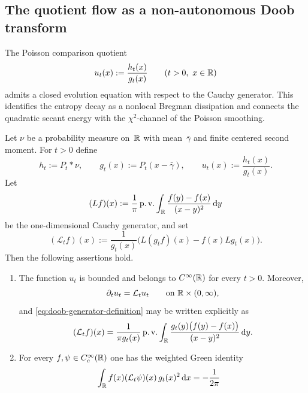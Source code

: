 \subsection{The quotient flow as a non-autonomous Doob transform}

The Poisson comparison quotient
\[
u_t(x):=\frac{h_t(x)}{g_t(x)}
\qquad(t>0,\ x\in\mathbb{R})
\]
admits a closed evolution equation with respect to the Cauchy generator.
This identifies the entropy decay as a nonlocal Bregman dissipation and
connects the quadratic secant energy with the $\chi^2$-channel of the
Poisson smoothing.

\begin{theorem}\label{thm:poisson-doob-phi-entropy}
Let $\nu$ be a probability measure on~$\mathbb{R}$ with mean~$\bar\gamma$ and
finite centered second moment.  For $t>0$ define
\[
h_t:=P_t*\nu,
\qquad
g_t(x):=P_t(x-\bar\gamma),
\qquad
u_t(x):=\frac{h_t(x)}{g_t(x)}.
\]
Let
\[
(Lf)(x):=\frac{1}{\pi}\operatorname{p.v.}\int_{\mathbb{R}}
\frac{f(y)-f(x)}{(x-y)^2}\,\mathrm{d} y
\]
be the one-dimensional Cauchy generator, and set
\begin{equation}\label{eq:doob-generator-definition}
(\mathcal L_t f)(x)
:=\frac{1}{g_t(x)}\bigl(L(g_tf)(x)-f(x)Lg_t(x)\bigr).
\end{equation}
Then the following assertions hold.
\begin{enumerate}[label=(\roman*)]
\item
      The function $u_t$ is bounded and belongs to $C^\infty(\mathbb{R})$ for
      every $t>0$.  Moreover,
      \begin{equation}\label{eq:quotient-flow-equation}
      \partial_tu_t=\mathcal L_tu_t
      \qquad\text{on }\mathbb{R}\times(0,\infty),
      \end{equation}
      and \eqref{eq:doob-generator-definition} may be written explicitly
      as
      \begin{equation}\label{eq:doob-generator-kernel}
      (\mathcal L_tf)(x)
      =\frac{1}{\pi g_t(x)}\operatorname{p.v.}\int_{\mathbb{R}}
      \frac{g_t(y)\bigl(f(y)-f(x)\bigr)}{(x-y)^2}\,\mathrm{d} y.
      \end{equation}
\item
      For every $f,\psi\in C_c^\infty(\mathbb{R})$ one has the weighted Green
      identity
      \begin{equation}\label{eq:doob-green-identity}
      \begin{split}
      \int_{\RR}f(x)(\mathcal L_t\psi)(x)\,g_t(x)^2\dd x
      &=
      -\frac{1}{2\pi}

\end{split}
\end{equation}
\end{enumerate}
\end{theorem}
